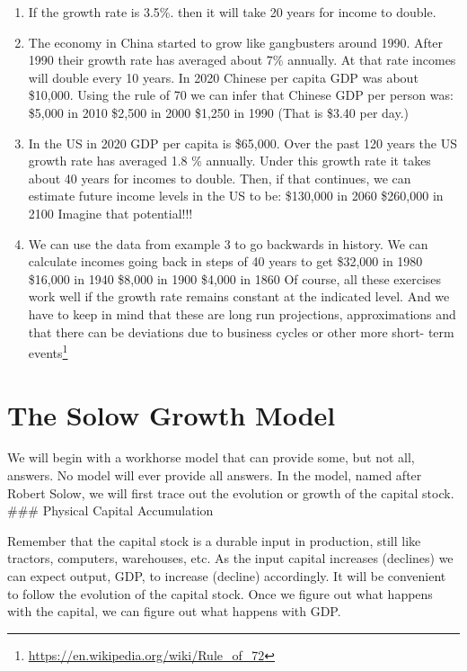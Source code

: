 \documentclass[
]{book}
\begin{document}
\begin{enumerate}
\def\labelenumi{\arabic{enumi}.}
\item
  If the growth rate is 3.5\%. then it will take 20 years for income to double.
\item
  The economy in China started to grow like gangbusters around 1990. After 1990 their growth rate has averaged about 7\% annually. At that rate incomes will double every 10 years. In 2020 Chinese per capita GDP was about \$10,000. Using the rule of 70 we can infer that Chinese GDP per person was:
  \$5,000 in 2010
  \$2,500 in 2000
  \$1,250 in 1990 (That is \$3.40 per day.)
\item
  In the US in 2020 GDP per capita is \$65,000. Over the past 120 years the US growth rate has averaged 1.8 \% annually. Under this growth rate it takes about 40 years for incomes to double. Then, if that continues, we can estimate future income levels in the US to be:
  \$130,000 in 2060
  \$260,000 in 2100
  Imagine that potential!!!
\item
  We can use the data from example 3 to go backwards in history. We can calculate incomes going back in steps of 40 years to get
  \$32,000 in 1980
  \$16,000 in 1940
  \$8,000 in 1900
  \$4,000 in 1860
  Of course, all these exercises work well if the growth rate remains constant at the indicated level. And we have to keep in mind that these are long run projections, approximations and that there can be deviations due to business cycles or other more short- term events\footnote{\url{https://en.wikipedia.org/wiki/Rule_of_72}}
\end{enumerate}

\hypertarget{the-solow-growth-model}{%
\section{The Solow Growth Model}\label{the-solow-growth-model}}

We will begin with a workhorse model that can provide some, but not all, answers. No model will ever provide all answers. In the model, named after Robert Solow, we will first trace out the evolution or growth of the capital stock.
\#\#\# Physical Capital Accumulation

Remember that the capital stock is a durable input in production, still like tractors, computers, warehouses, etc. As the input capital increases (declines) we can expect output, GDP, to increase (decline) accordingly. It will be convenient to follow the evolution of the capital stock. Once we figure out what happens with the capital, we can figure out what happens with GDP.
\end{document}
